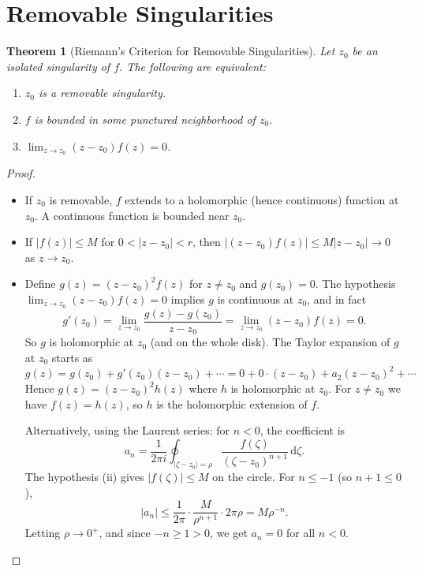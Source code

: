 \documentclass[12pt,a4paper,openany]{book}
\theoremstyle{definition}
\theoremstyle{plain}
\newtheorem{theorem}[definition]{Theorem}
\theoremstyle{remark}
\newcommand{\dd}{\mathrm{d}}
\newcommand{\abs}[1]{\left|#1\right|}
\begin{document}
\section{Removable Singularities}
\label{sec:removable}

\begin{theorem}[Riemann's Criterion for Removable Singularities]\label{thm:riemann-removable}
Let $z_0$ be an isolated singularity of $f$. The following are equivalent:
\begin{enumerate}[label=(\roman*)]
  \item $z_0$ is a removable singularity.
  \item $f$ is bounded in some punctured neighborhood of $z_0$.
  \item $\lim_{z\to z_0}(z-z_0)f(z) = 0$.
\end{enumerate}
\end{theorem}

\begin{proof}\
\begin{itemize}[leftmargin=2em]
\item[\textbf{(i)$\Rightarrow$(ii)}:]
If $z_0$ is removable, $f$ extends to a holomorphic (hence continuous) function
at $z_0$. A continuous function is bounded near $z_0$.

\item[\textbf{(ii)$\Rightarrow$(iii)}:]
If $\abs{f(z)}\le M$ for $0<\abs{z-z_0}<r$, then
$\abs{(z-z_0)f(z)}\le M\abs{z-z_0}\to 0$ as $z\to z_0$.

\item[\textbf{(iii)$\Rightarrow$(i)}:]
Define $g(z)=(z-z_0)^2 f(z)$ for $z\ne z_0$ and $g(z_0)=0$. The hypothesis
$\lim_{z\to z_0}(z-z_0)f(z)=0$ implies $g$ is continuous at $z_0$, and in fact
\[
  g'(z_0) = \lim_{z\to z_0}\frac{g(z)-g(z_0)}{z-z_0}
  = \lim_{z\to z_0}(z-z_0)f(z) = 0.
\]
So $g$ is holomorphic at $z_0$ (and on the whole disk). The Taylor expansion of
$g$ at $z_0$ starts as $g(z)=g(z_0)+g'(z_0)(z-z_0)+\cdots = 0 + 0\cdot(z-z_0)+a_2(z-z_0)^2+\cdots$
Hence $g(z)=(z-z_0)^2 h(z)$ where $h$ is holomorphic at $z_0$. For $z\ne z_0$
we have $f(z)=h(z)$, so $h$ is the holomorphic extension of $f$.

Alternatively, using the Laurent series: for $n<0$, the coefficient is
\[
  a_n = \frac{1}{2\pi i}\oint_{\abs{\zeta-z_0}=\rho}
    \frac{f(\zeta)}{(\zeta-z_0)^{n+1}}\,\dd\zeta.
\]
The hypothesis (ii) gives $\abs{f(\zeta)}\le M$ on the circle. For $n\le -1$
(so $n+1\le 0$),
\[
  \abs{a_n} \le \frac{1}{2\pi}\cdot\frac{M}{\rho^{n+1}}\cdot 2\pi\rho
  = M\rho^{-n}.
\]
Letting $\rho\to 0^+$, and since $-n\ge 1>0$, we get $a_n=0$ for all $n<0$.
\end{itemize}
\end{proof}
\end{document}
